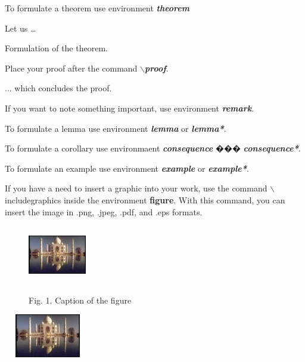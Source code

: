 \documentclass[11pt, twoside]{article}
\begin{document}
To formulate a theorem use environment \textit{\textbf{theorem}}

\begin{theorem} \textsc{\cite{Kilb}}
\label{t-1.1}
Let us \dots

Formulation of the theorem.
\end{theorem}

\proof
Place your proof after the command \textit{\textbf{$\backslash$proof}}.

... which concludes the proof.

\begin{remark}
If you want to note something important, use environment \textit{\textbf{remark}}.
\end{remark}

\begin{lemma*}
\label{t-1.2}
\textsc{\cite{Arestov2}}
To formulate a lemma use environment \textit{\textbf{lemma}} or
\textit{\textbf{lemma*}}.
\end{lemma*}


\begin{consequence*}
To formulate a corollary use environmaent \textit{\textbf{consequence}} ��� \textit{\textbf{consequence*}}.

\end{consequence*}

\begin{example}
To formulate an example use environment \textit{\textbf{example}} or
\textit{\textbf{example*}}.
\end{example}

If you have a need to insert a graphic into your work, use the command 
$\backslash$includegra\-phics inside the environment {\bf figure}. 
With this command, you can insert the image in .png, .jpeg, .pdf, and .eps formats.

\begin{figure}[th!]
\includegraphics[width=1in, height=1in]{taj_mahal}\\
\centerline{Fig. 1. Caption of the figure}
\end{figure}

\includegraphics[width=1.5in, height=0.75in, angle=20]{taj_mahal}
\end{document}
